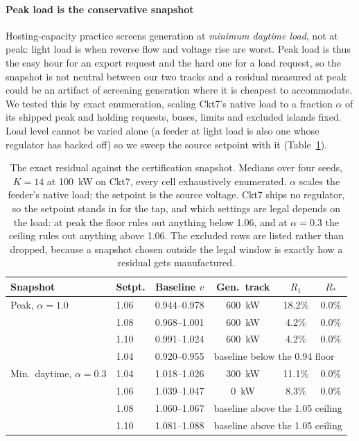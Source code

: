 \documentclass[review,authoryear,12pt]{elsarticle}
\begin{document}
\paragraph{Peak load is the conservative snapshot}
Hosting-capacity practice screens generation at \emph{minimum daytime load},
not at peak: light load is when reverse flow and voltage rise are worst. Peak
load is thus the easy hour for an export request and the hard one for a load
request, so the snapshot is not neutral between our two tracks and a residual
measured at peak could be an artifact of screening generation where it is
cheapest to accommodate. We tested this by exact enumeration, scaling Ckt7's
native load to a fraction $\alpha$ of its shipped peak and holding requests,
buses, limits and excluded islands fixed. Load level cannot be varied alone
(a feeder at light load is also one whose regulator has backed off) so
we sweep the source setpoint with it (Table~\ref{tab:snapshot}).

\begin{table}[htbp]
\centering
\caption{The exact residual against the certification snapshot. Medians over
four seeds, $K=14$ at 100~kW on Ckt7, every cell exhaustively enumerated.
$\alpha$ scales the feeder's native load; the setpoint is the source voltage.
Ckt7 ships no regulator, so the setpoint stands in for the tap, and which
settings are legal depends on the load: at peak the floor rules out anything
below 1.06, and at $\alpha=0.3$ the ceiling rules out anything above 1.06. The
excluded rows are listed rather than dropped, because a snapshot chosen outside
the legal window is exactly how a residual gets manufactured.}
\label{tab:snapshot}
\footnotesize
\begin{tabular}{@{}llcccc@{}}
\toprule
Snapshot & Setpt. & Baseline $v$ & Gen.\ track & $R_1$ & $R_{\ast}$ \\
\midrule
Peak, $\alpha=1.0$ & 1.06 & 0.944--0.978 & 600~kW & 18.2\% & 0.0\% \\
                   & 1.08 & 0.968--1.001 & 600~kW & 4.2\% & 0.0\% \\
                   & 1.10 & 0.991--1.024 & 600~kW & 4.2\% & 0.0\% \\
                   & 1.04 & 0.920--0.955 & \multicolumn{3}{l}{baseline below the 0.94 floor} \\
\midrule
Min.\ daytime, $\alpha=0.3$ & 1.04 & 1.018--1.026 & 300~kW & 11.1\% & 0.0\% \\
                   & 1.06 & 1.039--1.047 & 0~kW & 8.3\% & 0.0\% \\
                   & 1.08 & 1.060--1.067 & \multicolumn{3}{l}{baseline above the 1.05 ceiling} \\
                   & 1.10 & 1.081--1.088 & \multicolumn{3}{l}{baseline above the 1.05 ceiling} \\
\bottomrule
\end{tabular}
\end{table}
\end{document}
